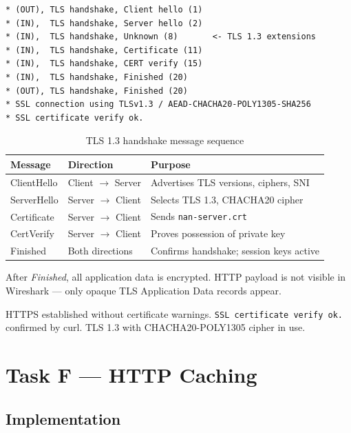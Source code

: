 \documentclass[12pt,a4paper]{article}
\begin{document}
\begin{lstlisting}
* (OUT), TLS handshake, Client hello (1)
* (IN),  TLS handshake, Server hello (2)
* (IN),  TLS handshake, Unknown (8)       <- TLS 1.3 extensions
* (IN),  TLS handshake, Certificate (11)
* (IN),  TLS handshake, CERT verify (15)
* (IN),  TLS handshake, Finished (20)
* (OUT), TLS handshake, Finished (20)
* SSL connection using TLSv1.3 / AEAD-CHACHA20-POLY1305-SHA256
* SSL certificate verify ok.
\end{lstlisting}

\begin{table}[h!]
\centering
\caption{TLS 1.3 handshake message sequence}
\begin{tabular}{lll}
\toprule
\textbf{Message} & \textbf{Direction} & \textbf{Purpose} \\
\midrule
ClientHello & Client $\rightarrow$ Server & Advertises TLS versions, ciphers, SNI \\
ServerHello & Server $\rightarrow$ Client & Selects TLS 1.3, CHACHA20 cipher \\
Certificate & Server $\rightarrow$ Client & Sends \texttt{nan-server.crt} \\
CertVerify & Server $\rightarrow$ Client & Proves possession of private key \\
Finished & Both directions & Confirms handshake; session keys active \\
\bottomrule
\end{tabular}
\end{table}

After \textit{Finished}, all application data is encrypted. HTTP payload is not visible in Wireshark --- only opaque TLS Application Data records appear.

\begin{successbox}[Result]
HTTPS established without certificate warnings. \texttt{SSL certificate verify ok.} confirmed by curl. TLS 1.3 with CHACHA20-POLY1305 cipher in use.
\end{successbox}

\section{Task F --- HTTP Caching}

\subsection{Implementation}
\end{document}
